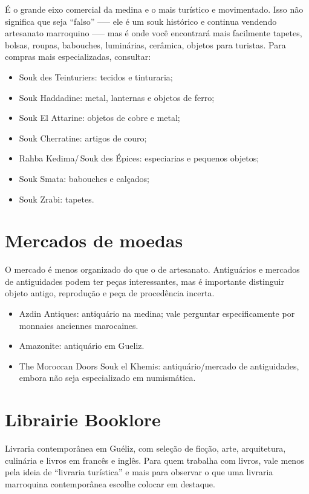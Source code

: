 É o grande eixo comercial da medina e o mais turístico e movimentado. Isso não significa que seja ``falso'' --— ele é um souk histórico e continua vendendo artesanato marroquino --— mas é onde você encontrará mais facilmente tapetes, bolsas, roupas, babouches, luminárias, cerâmica, objetos para turistas. Para compras mais especializadas, consultar:

\begin{itemize}
\item Souk des Teinturiers: tecidos e tinturaria;
\item Souk Haddadine: metal, lanternas e objetos de ferro;
\item Souk El Attarine: objetos de cobre e metal;
\item Souk Cherratine: artigos de couro;
\item Rahba Kedima/\,Souk des Épices: especiarias e pequenos objetos;
\item Souk Smata: babouches e calçados;
\item Souk Zrabi: tapetes.
\end{itemize}

\chapter{Mercados de moedas}

O mercado é menos organizado do que o de artesanato. Antiguários e mercados de antiguidades podem ter peças interessantes, mas é importante distinguir objeto antigo, reprodução e peça de procedência incerta.

\begin{itemize}
\item Azdin Antiques: antiquário na medina; vale perguntar especificamente por monnaies anciennes marocaines.
\item Amazonite: antiquário em Gueliz.
\item The Moroccan Doors Souk el Khemis: antiquário/mercado de antiguidades, embora não seja especializado em numismática.
\end{itemize}

\chapter{Librairie Booklore} 

Livraria contemporânea em Guéliz, com seleção de ficção, arte, arquitetura, culinária e livros em francês e inglês. Para quem trabalha com livros, vale menos pela ideia de ``livraria turística'' e mais para observar o que uma livraria marroquina contemporânea escolhe colocar em destaque.

